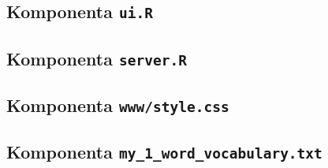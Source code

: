 \subsection{Komponenta \texttt{ui.R}}




\subsection{Komponenta \texttt{server.R}}




\subsection{Komponenta \texttt{www/style.css}}




\subsection{Komponenta \texttt{my\_1\_word\_vocabulary.txt}}










